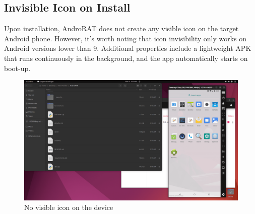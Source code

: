 \documentclass[12pt]{article}
\begin{document}
\subsection{Invisible Icon on Install}
Upon installation, AndroRAT does not create any visible icon on the target Android phone. However, it's worth noting that icon invisibility only works on Android versions lower than 9. Additional properties include a lightweight APK that runs continuously in the background, and the app automatically starts on boot-up.
\begin{figure}[h!]
  \centering
  \includegraphics[width=0.6\linewidth]{noicon.png}
  \caption{No visible icon on the device}
\end{figure}
\end{document}
